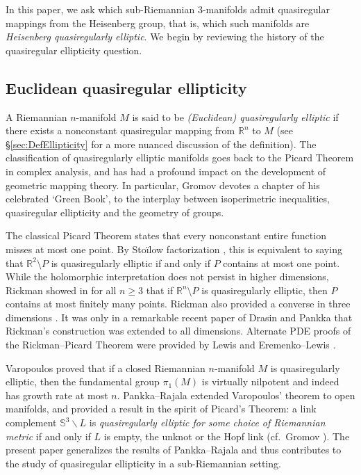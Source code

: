 \documentclass[10pt,letterpaper]{amsart}
\theoremstyle{definition}
\numberwithin{thm}{subsection}
\numberwithin{equation}{section}
\begin{document}
In this paper, we ask which sub-Riemannian 3-manifolds admit quasiregular mappings from the Heisenberg group, that is, which such manifolds are {\it Heisenberg quasiregularly elliptic}. We begin by reviewing the history of the quasiregular ellipticity question.

\subsection{Euclidean quasiregular ellipticity}
A Riemannian $n$-manifold $M$ is said to be \emph{(Euclidean)
quasiregularly elliptic} if there exists a nonconstant
quasiregular mapping from ${\mathbb R}^n$ to $M$  (see \S \ref{sec:DefEllipticity} for a more nuanced discussion of the definition).
The classification of
quasiregularly elliptic manifolds goes back to the Picard Theorem
in complex analysis, and has had a profound impact on the
development of geometric mapping theory. In particular, Gromov
devotes a chapter of his celebrated `Green Book', \cite[Chapter
6]{MR2307192} to the interplay between isoperimetric inequalities,
quasiregular ellipticity and the geometry of groups.

The classical Picard Theorem states that every nonconstant entire function misses at most one point. By Sto\"ilow
factorization \cite{MR0082545,MR0344463},
this is equivalent to saying that ${\mathbb R}^2 \setminus P$ is
quasiregularly elliptic if and only if $P$ contains at most one
point. While the holomorphic interpretation does not persist in
higher dimensions, Rickman showed in \cite{MR583633} for all $n\geq 3$
that if ${\mathbb R}^n \setminus P$ is quasiregularly elliptic, then $P$
contains at most finitely many points. Rickman also provided a converse in three dimensions
\cite{MR781587}. It was only in a remarkable recent paper of
Drasin and Pankka \cite{MR3372169} that Rickman's construction was extended
to all dimensions. Alternate PDE proofs of the Rickman--Picard
Theorem were provided by Lewis and Eremenko--Lewis
\cite{MR1195483, MR1139803}.

Varopoulos \cite[pp.\
146--147]{MR1218884} proved that if a closed Riemannian
$n$-manifold $M$ is quasiregularly elliptic, then the fundamental
group $\pi_1(M)$  is virtually nilpotent and indeed has growth
rate at most $n$. Pankka--Rajala \cite{MR2832708} extended
Varopoulos' theorem to open manifolds, and provided a result in
the spirit of Picard's Theorem: a link complement ${\mathbb S}^3\backslash
L$ is \emph{quasiregularly elliptic for some choice of Riemannian
metric} if and only if $L$ is empty, the unknot or the Hopf link
(cf.\ Gromov \cite[Examples 6.12]{MR2307192}). The present paper
generalizes the results of Pankka--Rajala and thus contributes to the study of quasiregular ellipticity in a sub-Riemannian setting.
\end{document}
